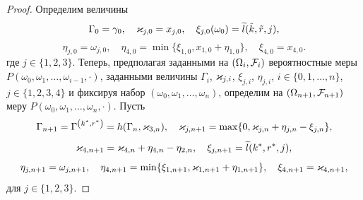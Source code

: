 \documentclass[a4paper,12pt,russian]{extarticle}
\newcommand{\G}{\Gamma}
\newcommand{\ga}[1]{\Gamma^{\left( #1 \right)} }
\begin{document}
\begin{proof}
Определим величины
\begin{equation}
\G_0=\gamma_0, \quad \vk_{j,0}=x_{j,0}, \quad \xi_{j,0}(\omega_0)=\widetilde{l}(\tilde{k},\tilde{r},j),
\label{startRekOne}
\end{equation}
\begin{equation}
\eta_{j,0}=\omega_{j,0}, \quad \eta_{4,0}=\min\{\xi_{1,0}, x_{1,0}+\eta_{1,0}\}, \quad \xi_{4,0}=x_{4,0}.
\label{startRekTwo}
\end{equation}
где $j\in \{1,2,3\}$.
Теперь, предполагая заданными на $(\Omega_i, {\cal F}_i)$ вероятностные меры $P(\omega_0, \omega_1, \ldots, \omega_{i-1},\cdot)$, заданными величины $\G_i$, $\varkappa_{j,i}$, $\xi_{j,i}$, $\eta_{j,i}$, $i\in \{0,1,\ldots,n\}$, $j\in \{1, 2, 3, 4\}$ и фиксируя набор $(\omega_0, \omega_1, \ldots, \omega_{n})$, определим на $(\Omega_{n+1}, {\cal F}_{n+1})$ меру $P(\omega_0, \omega_1, \ldots, \omega_n,\cdot)$. Пусть
\begin{equation}
\G_{n+1}=\ga{k^*,r^*}=h(\G_{n},\vk_{3,n}), \quad \vk_{j,n+1}=\max\{ 0,\vk_{j,n}+\eta_{j,n} -\xi_{j,n}\},
\label{NextRekOne}
\end{equation}
\begin{equation}
\varkappa_{4,n+1}=\varkappa_{4,n}+\eta_{4,n}-\eta_{2,n}, \quad \xi_{j,n+1}=\widetilde{l}(k^*,r^*,j),
\label{NextRekTwo}
\end{equation}
\begin{equation}
\eta_{j,n+1}=\omega_{j,n+1}, \quad \eta_{4,n+1}=\min\{\xi_{1,n+1}, \varkappa_{1,n+1}+\eta_{1,n+1}\}, \quad \xi_{4,n+1}=\varkappa_{4,n+1},
\label{NextRekThree}
\end{equation}
для $j\in \{1, 2, 3\}$.

\end{proof}
\end{document}
